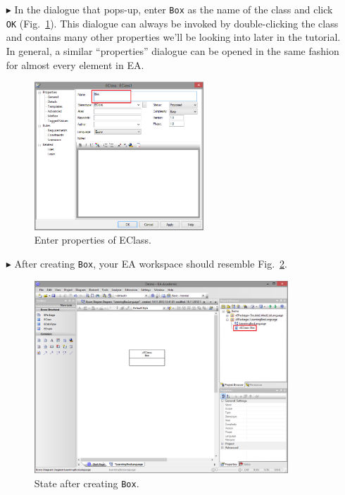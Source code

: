 \begin{enumerate}
\item[$\blacktriangleright$] In the dialogue that pops-up, enter \texttt{Box} as the name of the class and click \texttt{OK} (Fig.~\ref{fig:eclass_properties}).
This dialogue can always be invoked by double-clicking the class and contains many other properties we'll be looking into later in the tutorial.
In general, a similar ``properties'' dialogue can be opened in the same fashion for almost every element in EA.

\begin{figure}[htbp]
	\centering
  \includegraphics[width=0.6\textwidth]{pics/memBoxBilder/memBox08.png}
	\caption{Enter properties of EClass.}
	\label{fig:eclass_properties}
\end{figure}

\item[$\blacktriangleright$] After creating \texttt{Box}, your EA workspace should resemble Fig.~\ref{fig:eclass_completed}.

\begin{figure}[htbp]
	\centering
  \includegraphics[width=0.9\textwidth]{pics/memBoxBilder/memBox09.png}
	\caption{State after creating \texttt{Box}.}
	\label{fig:eclass_completed}
\end{figure}



\end{enumerate}
